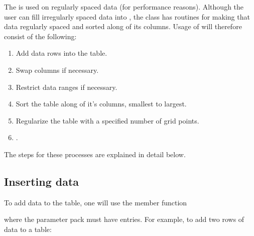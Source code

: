 \documentclass[letterpaper,10pt,english]{sphinxmanual}
\begin{document}
The  is used on regularly spaced data (for performance reasons).
Although the user can fill irregularly spaced data into , the class has routines for making that data regularly spaced and sorted along of its columns.
Usage of  will therefore consist of the following:
\begin{enumerate}
%
\item {} 
Add data rows into the table.

\item {} 
Swap columns if necessary.

\item {} 
Restrict data ranges if necessary.

\item {} 
Sort the table along of it’s columns, smallest to largest.

\item {} 
Regularize the table with a specified number of grid points.

\item {} 
.

\end{enumerate}

The steps for these processes are explained in detail below.


\subsection{Inserting data}
\label{\detokenize{Utilities/LookupTable:inserting-data}}
To add data to the table, one will use the member function

\begin{sphinxVerbatim}[commandchars=\\\{\},formatcom=\scriptsize]
  
   
\end{sphinxVerbatim}

where the parameter pack must have  entries.
For example, to add two rows of data to a table:

\begin{sphinxVerbatim}[commandchars=\\\{\},formatcom=\scriptsize]
 

  
  
\end{sphinxVerbatim}
\end{document}
